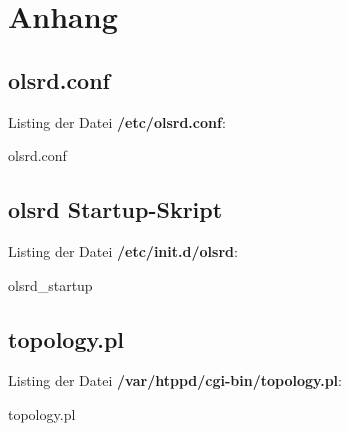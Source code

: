 
\section{Anhang}

\subsection{olsrd.conf}
\label{olsrd.conf}

Listing der Datei \textbf{/etc/olsrd.conf}:

{olsrd.conf}

\subsection{olsrd Startup-Skript}
\label{olsrd_startup}

Listing der Datei \textbf{/etc/init.d/olsrd}:

{olsrd_startup}

\subsection{topology.pl}
\label{topology.pl}

Listing der Datei \textbf{/var/htppd/cgi-bin/topology.pl}:

{topology.pl}
